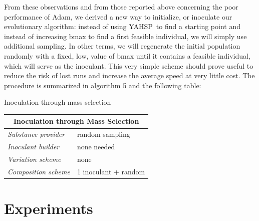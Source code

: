 \documentclass[english]{DESCARWINreport}
\newcommand{\YAHSP}{{\sc YAHSP}}
\begin{document}
From these observations and from those reported above concerning the poor performance of Adam, we derived a new way to initialize, or inoculate our evolutionary algorithm: instead of using \YAHSP\ to find a starting point and instead of increasing bmax to find a first feasible individual, we will simply use additional sampling. In other terms, we will regenerate the initial population randomly with a fixed, low, value of bmax until it contains a feasible individual, which will serve as the inoculant. This very simple scheme should prove useful to reduce the risk of lost runs and increase the average speed at very little cost. The procedure is summarized in algorithm 5 and  the following table:


\begin{algorithm}[h!]
\caption{Inoculation through mass selection}
\label{algoInitMass}
{\small
\begin{algorithmic}[1]
 \hfill {}


 \hfill {}
\ENDIF
\ENDFOR
\ENDWHILE
\end{algorithmic}
}
\end{algorithm}


\begin{center}
\begin{tabular}{|l|l|}
  \hline
  \multicolumn{2}{|c|}{\bf Inoculation through Mass Selection} \\
  \hline
  \emph{Substance provider} & random sampling \\
  \emph{Inoculant builder} & none needed \\
	\emph{Variation scheme} & none \\
	\emph{Composition scheme} & 1 inoculant + random \\
  \hline
\end{tabular}
\end{center}

\section{Experiments}
\end{document}
